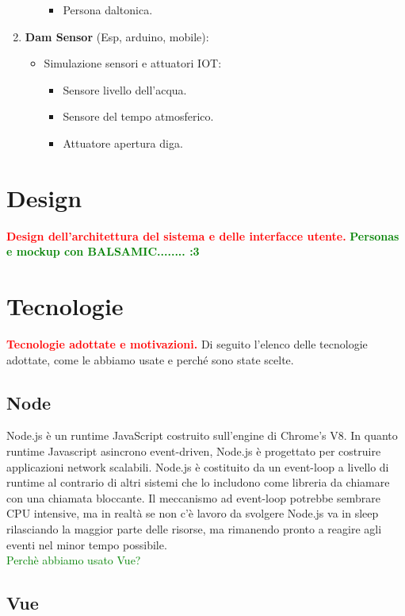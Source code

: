 \documentclass{article}
\begin{document}
\begin{enumerate}
\begin{itemize}
\begin{itemize}
			\item Persona daltonica.
		\end{itemize}
	\end{itemize}
	\item \textbf{Dam Sensor} (Esp, arduino, mobile):
	\begin{itemize}
		\item Simulazione sensori e attuatori IOT:
		\begin{itemize}
			\item Sensore livello dell'acqua.
			\item Sensore del tempo atmosferico.
			\item Attuatore apertura diga.
		\end{itemize}
	\end{itemize}
\end{enumerate}

\section{Design}
\textcolor{red}{\textbf{Design dell'architettura del sistema e delle interfacce utente.}}
\textcolor{green}{\textbf{Personas e mockup con BALSAMIC........ :3}}

\section{Tecnologie}
\textcolor{red}{\textbf{Tecnologie adottate e motivazioni.}}
Di seguito l'elenco delle tecnologie adottate, come le abbiamo usate e perché sono state scelte.
\subsection{Node}
Node.js è un runtime JavaScript costruito sull'engine di Chrome's V8.
In quanto runtime Javascript asincrono event-driven, Node.js è progettato per costruire applicazioni network scalabili. Node.js è costituito da un event-loop a livello di runtime al contrario di altri sistemi che lo includono come libreria da chiamare con una chiamata bloccante. Il meccanismo ad event-loop potrebbe sembrare CPU intensive, ma in realtà se non c'è lavoro da svolgere Node.js va in sleep rilasciando la maggior parte delle risorse, ma rimanendo pronto a reagire agli eventi nel minor tempo possibile.
\\
\textcolor{green}{Perchè abbiamo usato Vue?}

\subsection{Vue}
\end{document}
